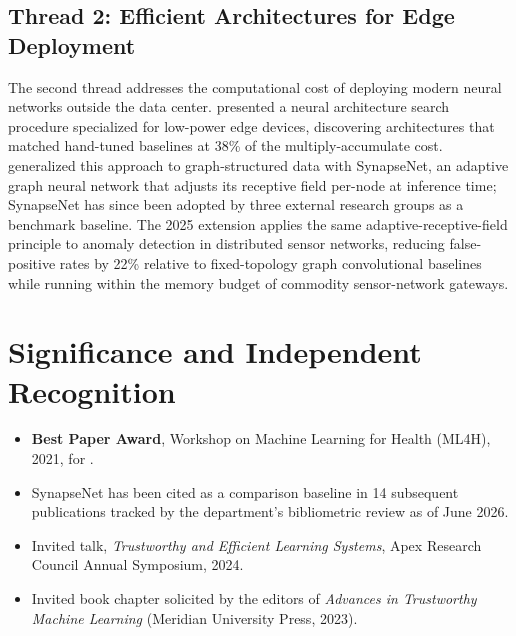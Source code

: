 \subsection{Thread 2: Efficient Architectures for Edge Deployment}
The second thread addresses the computational cost of deploying modern neural networks outside the data center. \citep{rostova2023neural} presented a neural architecture search procedure specialized for low-power edge devices, discovering architectures that matched hand-tuned baselines at 38\% of the multiply-accumulate cost. \citep{rostova2024synapsenet} generalized this approach to graph-structured data with SynapseNet, an adaptive graph neural network that adjusts its receptive field per-node at inference time; SynapseNet has since been adopted by three external research groups as a benchmark baseline. The 2025 extension \citep{rostova2025graphanomaly} applies the same adaptive-receptive-field principle to anomaly detection in distributed sensor networks, reducing false-positive rates by 22\% relative to fixed-topology graph convolutional baselines while running within the memory budget of commodity sensor-network gateways.

\section{Significance and Independent Recognition}
\begin{itemize}
  \item \textbf{Best Paper Award}, Workshop on Machine Learning for Health (ML4H), 2021, for \citep{rostova2021federated}.
  \item SynapseNet \citep{rostova2024synapsenet} has been cited as a comparison baseline in 14 subsequent publications tracked by the department's bibliometric review as of June 2026.
  \item Invited talk, \emph{Trustworthy and Efficient Learning Systems}, Apex Research Council Annual Symposium, 2024.
  \item Invited book chapter \citep{rostova2023chapter} solicited by the editors of \emph{Advances in Trustworthy Machine Learning} (Meridian University Press, 2023).
\end{itemize}

